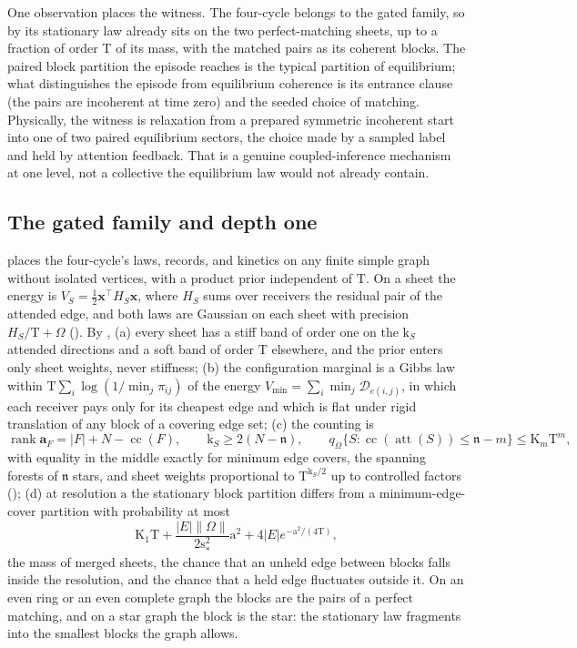 One observation places the witness. The four-cycle belongs to the gated family, so by
 its stationary law already sits on the two perfect-matching sheets, up to a
fraction of order \(\mathrm T\) of its mass, with the matched pairs as its coherent blocks. The paired block
partition the episode reaches is the typical partition of equilibrium; what distinguishes the episode from
equilibrium coherence is its entrance clause (the pairs are incoherent at time zero) and the seeded choice
of matching. Physically, the witness is relaxation from
a prepared symmetric incoherent start into one of two paired equilibrium sectors, the choice made by a
sampled label and held by attention feedback. That is a genuine coupled-inference mechanism at one level,
not a collective the equilibrium law would not already contain.

\subsection{The gated family and depth one}
\label{comp:ch13-gated}

 places the four-cycle's laws, records, and kinetics on any finite
simple graph without isolated vertices, with a product prior independent of \(\mathrm T\). On a sheet the
energy is \(V_S=\tfrac12\mathbf x^\top H_S\mathbf x\), where \(H_S\) sums over receivers the residual pair of
the attended edge, and both laws are Gaussian on each sheet with precision \(H_S/\mathrm T+\Omega\)
(). By , (a) every sheet has a stiff band of order
one on the \(\mathrm k_S\) attended directions and a soft band of order \(\mathrm T\) elsewhere, and the prior
enters only sheet weights, never stiffness; (b) the configuration marginal is a Gibbs law within
\(\mathrm T\sum_i\log(1/\min_j\pi_{ij})\) of the energy \(V_{\min}=\sum_i\min_j\mathcal D_{e(i,j)}\), in which each
receiver pays only for its cheapest edge and which is flat under rigid translation of any block of a
covering edge set; (c) the counting is
\[
\operatorname{rank}\mathbf a_F=|F|+N-\operatorname{cc}(F),
\qquad
\mathrm k_S\ge2(N-\mathfrak n),
\qquad
q_\Omega\{S:\operatorname{cc}(\operatorname{att}(S))\le\mathfrak n-m\}\le\mathrm K_m\mathrm T^m,
\]
with equality in the middle exactly for minimum edge covers, the spanning forests of \(\mathfrak n\) stars,
and sheet weights proportional to \(\mathrm T^{\mathrm k_S/2}\) up to controlled factors
(); (d) at resolution \(\mathrm a\) the stationary block partition differs from
a minimum-edge-cover partition with probability at most
\[
\mathrm K_1\mathrm T+\frac{|E|\|\Omega\|}{2\mathrm s_*^2}\mathrm a^2+4|E|e^{-\mathrm a^2/(4\mathrm T)},
\]
the mass of merged sheets, the chance that an unheld edge between blocks falls inside the resolution, and
the chance that a held edge fluctuates outside it. On an even ring or an even complete graph the blocks are
the pairs of a perfect matching, and on a star graph the block is the star: the stationary law fragments
into the smallest blocks the graph allows.

